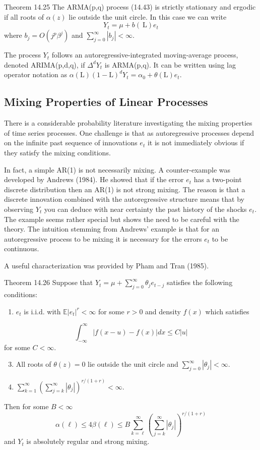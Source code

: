 \documentclass[10pt]{article}
\begin{document}
Theorem 14.25 The ARMA(p,q) process (14.43) is strictly stationary and ergodic if all roots of $\alpha(z)$ lie outside the unit circle. In this case we can write
$$
Y_{t}=\mu+b(\mathrm{~L}) e_{t}
$$
where $b_{j}=O\left(j^{p} \beta^{j}\right)$ and $\sum_{j=0}^{\infty}\left|b_{j}\right|<\infty$.

The process $Y_{t}$ follows an autoregressive-integrated moving-average process, denoted ARIMA(p,d,q), if $\Delta^{d} Y_{t}$ is ARMA(p,q). It can be written using lag operator notation as $\alpha(\mathrm{L})(1-\mathrm{L})^{d} Y_{t}=\alpha_{0}+\theta(\mathrm{L}) e_{t}$.

\subsection{Mixing Properties of Linear Processes}
There is a considerable probability literature investigating the mixing properties of time series processes. One challenge is that as autoregressive processes depend on the infinite past sequence of innovations $e_{t}$ it is not immediately obvious if they satisfy the mixing conditions.

In fact, a simple AR(1) is not necessarily mixing. A counter-example was developed by Andrews (1984). He showed that if the error $e_{t}$ has a two-point discrete distribution then an AR(1) is not strong mixing. The reason is that a discrete innovation combined with the autoregressive structure means that by observing $Y_{t}$ you can deduce with near certainty the past history of the shocks $e_{t}$. The example seems rather special but shows the need to be careful with the theory. The intuition stemming from Andrews' example is that for an autoregressive process to be mixing it is necessary for the errors $e_{t}$ to be continuous.

A useful characterization was provided by Pham and Tran (1985).

Theorem 14.26 Suppose that $Y_{t}=\mu+\sum_{j=0}^{\infty} \theta_{j} e_{t-j}$ satisfies the following conditions:

\begin{enumerate}
  \item $e_{t}$ is i.i.d. with $\mathbb{E}\left|e_{t}\right|^{r}<\infty$ for some $r>0$ and density $f(x)$ which satisfies
\end{enumerate}
$$
\int_{-\infty}^{\infty}|f(x-u)-f(x)| d x \leq C|u|
$$
for some $C<\infty$.

\begin{enumerate}
  \setcounter{enumi}{2}
  \item All roots of $\theta(z)=0$ lie outside the unit circle and $\sum_{j=0}^{\infty}\left|\theta_{j}\right|<\infty$.

  \item $\sum_{k=1}^{\infty}\left(\sum_{j=k}^{\infty}\left|\theta_{j}\right|\right)^{r /(1+r)}<\infty$.

\end{enumerate}
Then for some $B<\infty$
$$
\alpha(\ell) \leq 4 \beta(\ell) \leq B \sum_{k=\ell}^{\infty}\left(\sum_{j=k}^{\infty}\left|\theta_{j}\right|\right)^{r /(1+r)}
$$
and $Y_{t}$ is absolutely regular and strong mixing.
\end{document}
